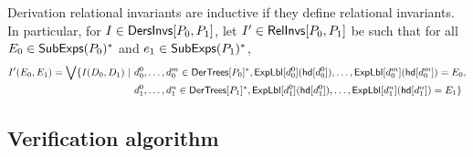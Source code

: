 Derivation relational invariants are inductive if they define
relational invariants.
%
In particular, for $I \in \mathsf{DersInvs}[ P_0, P_1 ]$, let $I' \in
\mathsf{RelInvs}[ P_0, P_1 ]$ be such that for all $E_0 \in \mathsf{SubExps}(P_0)^{*}$
and $e_1 \in \mathsf{SubExps}(P_1)^{*}$,
\begin{align*}
  I'(E_0, E_1) = %
  \biglor \setformer{ I(D_0, D_1)}{ %
    & d_0^0, \ldots, d_0^m \in \dertrees{P_0}^{*}, %
    \explabel{d_0^0}(\head{d_0^0}), \ldots,
    \explabel{d_0^m}(\head{d_0^m}) = E_0, \\
    & d_1^0, \ldots, d_1^n \in \dertrees{P_1}^{*},  %
    \explabel{d_1^0}(\head{d_1^0}), \ldots,
    \explabel{d_1^n}(\head{d_1^n}) = E_1 }
\end{align*}

\subsection{Verification algorithm}
\label{sec:verifier}
\begin{algorithm}[t]
  {  \label{line:aux-end} %
    \Return{$\verifyaux((\emptyset, \emptyset), %
      (\emptyset, \emptyset), \emptyset)$} \label{line:base-call} } %
  \caption{%
    \verify: given $P_0, P_1 \in \stlc$, decides if $P_0 \equiv P_1$.
    \verify uses procedures \mergeinvs (\autoref{sec:verifier}), %
    \chkinductive (\autoref{sec:chk-ind}), and %
    \verifyders (\autoref{sec:verify-ders}).
  }
  \label{alg:verify}
\end{algorithm}
%
%

